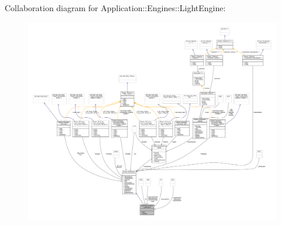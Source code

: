 Collaboration diagram for Application\+:\+:Engines\+:\+:Light\+Engine\+:
\nopagebreak
\begin{figure}[H]
\begin{center}
\leavevmode
\includegraphics[width=350pt]{classApplication_1_1Engines_1_1LightEngine__coll__graph}
\end{center}
\end{figure}
